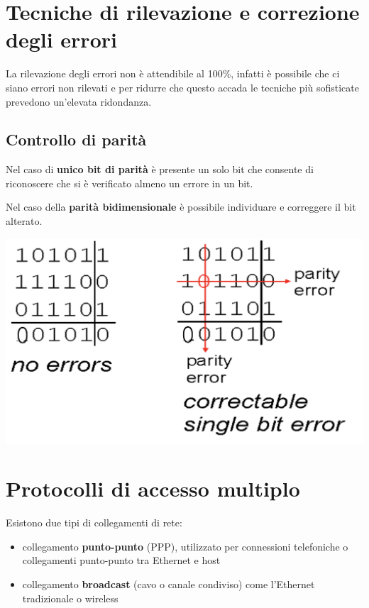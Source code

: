 \documentclass{report}
\begin{document}
\hypertarget{header-n33}{%
\section{Tecniche di rilevazione e correzione degli
errori}\label{header-n33}}

La rilevazione degli errori non è attendibile al 100\%, infatti è
possibile che ci siano errori non rilevati e per ridurre che questo
accada le tecniche più sofisticate prevedono un'elevata ridondanza.

\hypertarget{header-n35}{%
\subsection{Controllo di parità}\label{header-n35}}

Nel caso di \textbf{unico bit di parità} è presente un solo bit che
consente di riconoscere che si è verificato almeno un errore in un bit.

Nel caso della \textbf{parità bidimensionale} è possibile individuare e
correggere il bit alterato.

\begin{center}
	\includegraphics[width=0.7\linewidth]{parita-2d.png}
\end{center}

\hypertarget{header-n39}{%
\section{Protocolli di accesso multiplo}\label{header-n39}}

Esistono due tipi di collegamenti di rete:

\begin{itemize}
\item
  collegamento \textbf{punto-punto} (PPP), utilizzato per connessioni
  telefoniche o collegamenti punto-punto tra Ethernet e host
\item
  collegamento \textbf{broadcast} (cavo o canale condiviso) come
  l'Ethernet tradizionale o wireless
\end{itemize}
\end{document}
